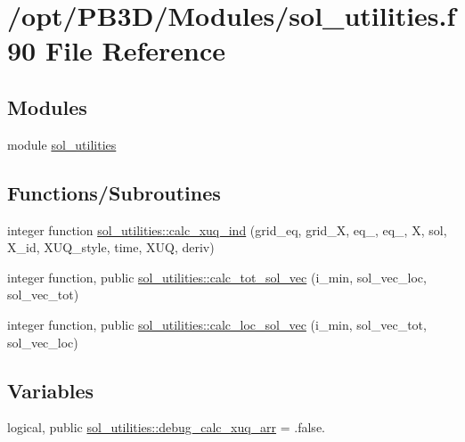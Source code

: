\hypertarget{sol__utilities_8f90}{}\section{/opt/\+P\+B3\+D/\+Modules/sol\+\_\+utilities.f90 File Reference}
\label{sol__utilities_8f90}
\subsection*{Modules}
\begin{DoxyCompactItemize}
\item 
module \hyperlink{namespacesol__utilities}{sol\+\_\+utilities}
\end{DoxyCompactItemize}
\subsection*{Functions/\+Subroutines}
\begin{DoxyCompactItemize}
\item 
integer function \hyperlink{namespacesol__utilities_a687c87db78ca79ec617a4cfb7ed62f9e}{sol\+\_\+utilities\+::calc\+\_\+xuq\+\_\+ind} (grid\+\_\+eq, grid\+\_\+X, eq\+\_, eq\+\_, X, sol, X\+\_\+id, X\+U\+Q\+\_\+style, time, X\+UQ, deriv)
\item 
integer function, public \hyperlink{namespacesol__utilities_ad23f2a5293e2d7caf78be4d8fdf5a06d}{sol\+\_\+utilities\+::calc\+\_\+tot\+\_\+sol\+\_\+vec} (i\+\_\+min, sol\+\_\+vec\+\_\+loc, sol\+\_\+vec\+\_\+tot)
\item 
integer function, public \hyperlink{namespacesol__utilities_ab58942363de62344fba9faa1d3c95be5}{sol\+\_\+utilities\+::calc\+\_\+loc\+\_\+sol\+\_\+vec} (i\+\_\+min, sol\+\_\+vec\+\_\+tot, sol\+\_\+vec\+\_\+loc)
\end{DoxyCompactItemize}
\subsection*{Variables}
\begin{DoxyCompactItemize}
\item 
logical, public \hyperlink{namespacesol__utilities_a4779ff845b4ddc046892bf4eb4490dd2}{sol\+\_\+utilities\+::debug\+\_\+calc\+\_\+xuq\+\_\+arr} = .false.
\end{DoxyCompactItemize}
